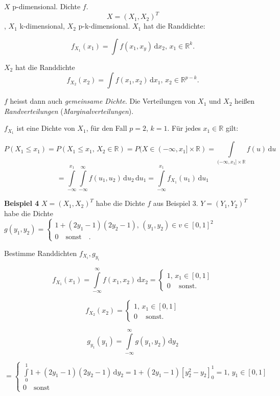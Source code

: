 \documentclass[12pt, a4paper]{article}
\theoremstyle{empty}
\newenvironment{beweis}[1][Beweis]{\begin{trivlist}
\item[\hskip \labelsep {\bfseries #1}]}{\end{trivlist}}
\newcommand{\R}{\mathbb{R}}
\newcommand{\1}{\mathds{1}}
\renewcommand{\d}{\,\mathrm{d}}
\providecommand{\mtext}[1]{\quad \text{#1} \quad}
\begin{document}
$X$ p-dimensional. Dichte $f$. \[ X = (X_1, X_2)^T \], $ X_1 $ k-dimensional, $X_2$ p-k-dimensional. $X_1$ hat die Randdichte:

\[ f_{X_1}(x_1) = \int f(x_1, x_y) \d x_2, \, x_1 \in \R^k .\]

$X_2$ hat die Randdichte \[ f_{X_2} (x_2) = \int f(x_1, x_2) \d x_1, \, x_2 \in \R^{p-k}. \]


$f$ heisst dann auch \emph{gemeinsame Dichte}. Die Verteilungen von $X_1$ und $X_2$ heißen \emph{Randverteilungen} (\emph{Marginalverteilungen}).




\begin{beweis}
$f_{X_1}$ ist eine Dichte von $X_1$, für den Fall $p=2$, $k=1$. Für jedes $x_1 \in \R$ gilt:

\[ P(X_1 \leq x_1) = P(X_1 \leq x_1, \, X_2 \in \R) = P( X \in (- \infty, x_1 ] \times \R) = \int\limits_{(-\infty, x_1] \times \R} f(u) \d u \]
\[= \int\limits_{-\infty}^{x_1} \int\limits_{-\infty}^{\infty} f(u_1, u_2) \d u_2 \d u_1  =  \int\limits_{-\infty}^{x_1} f_{X_1} (u_1)\d u_1 \]

\end{beweis}
	
\textbf{Beispiel 4}
$ X = (X_1, X_2)^T $ habe die Dichte $f$ aus Beispiel 3.
$ Y = (Y_1, Y_2)^T$ habe die Dichte $g(y_1, y_2) = \begin{cases} 1+(2 y_1 - 1)(2y_2 - 1), \, (y_1, y_2) \in v \in [0,1]^2 \\ 0 \mtext{sonst}.\end{cases}$

Bestimme Randdichten $f_{X_i}, g_{y_i}$

\[ f_{X_1}(x_1) = \int\limits_{-\infty}^{\infty}f(x_1, x_2) \d x_2 = 
\begin{cases} 1, \, x_1 \in [0,1] \\
0 \, \mtext{sonst.} \end{cases} \]

\[ f_{X_2}(x_2) = 
\begin{cases} 1, \, x_1 \in [0,1] \\
0 \, \mtext{sonst.} \end{cases} \]


\[ g_{y_1} (y_1) = \int\limits_{-\infty}^{\infty} g(y_1, y_2) \d y_2  \]

\[= \begin{cases} \int\limits_0^1 1+(2 y_1 - 1)(2y_2 - 1) \d y_2 = 1+ (2y_1 - 1) [y_2^2 - y_2]_0^1 = 1, \, y_1 \in [0,1]  \\ 0 \mtext{sonst} \end{cases} \]
\end{document}
